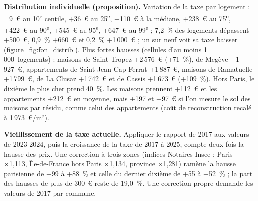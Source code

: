 \textbf{Distribution individuelle (proposition).} Variation de la taxe par logement : $-$9~€ au 10\textsuperscript{e}
centile, +36~€ au 25\textsuperscript{e}, +110~€ à la médiane, +238~€ au 75\textsuperscript{e}, +422~€ au
90\textsuperscript{e}, +545~€ au 95\textsuperscript{e}, +647~€ au 99\textsuperscript{e} ; 7,2~\% des logements dépassent
+500~€, 0,9~\% +660~€ et 0,2~\% +1\,000~€ ; un sur neuf voit sa taxe baisser (figure~\ref{fig:fon_distrib}). Plus fortes hausses (cellules d'au moins
1\,000~logements) : maisons de Saint-Tropez +2\,576~€ (+71~\%), de Megève +1\,927~€, appartements de Saint-Jean-Cap-Ferrat
+1\,887~€, maisons de Ramatuelle +1\,799~€, de La Clusaz +1\,742~€ et de Cassis +1\,673~€ (+109~\%). Hors Paris, le
dixième le plus cher prend 40~\%. Les maisons prennent +112~€ et les appartements +212~€ en moyenne, mais +197 et +97~€
si l'on mesure le sol des maisons par résidu, comme celui des appartements (coût de reconstruction recalé à
1\,973~€/m²).

\textbf{Vieillissement de la taxe actuelle.} Appliquer le rapport de 2017 aux valeurs de 2023-2024, puis la croissance de
la taxe de 2017 à 2025, compte deux fois la hausse des prix. Une correction à trois zones (indices Notaires-Insee : Paris
×1,113, Île-de-France hors Paris ×1,134, province ×1,281) ramène la hausse parisienne de +99 à +88~\% et celle du dernier
dixième de +55 à +52~\% ; la part des hausses de plus de 300~€ reste de 19,0~\%. Une correction propre demande les valeurs
de 2017 par commune.



